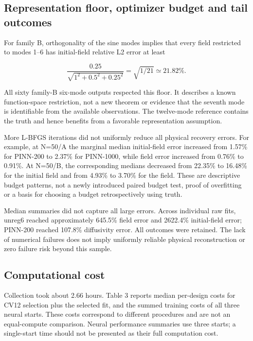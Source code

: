 \documentclass[10pt,a4paper]{article}
\begin{document}
\subsection{Representation floor, optimizer budget and tail outcomes}

For family B, orthogonality of the sine modes implies that every field restricted
to modes 1–6 has initial-field relative L2 error at least

\begin{equation}
\frac{0.25}{\sqrt{1^2+0.5^2+0.25^2}}
=\sqrt{1/21}\simeq21.82\%.
\end{equation}

All sixty family-B six-mode outputs respected this floor. It describes a known
function-space restriction, not a new theorem or evidence that the seventh
mode is identifiable from the available observations. The twelve-mode reference
contains the truth and hence benefits from a favorable representation assumption.

More L-BFGS iterations did not uniformly reduce all physical recovery errors.
For example, at N=50/A the marginal median initial-field error increased from
1.57\% for PINN-200 to 2.37\% for PINN-1000, while field error increased from
0.76\% to 0.91\%. At N=50/B, the corresponding medians decreased from 22.35\%
to 16.48\% for the initial field and from 4.93\% to 3.70\% for the field. These
are descriptive budget patterns, not a newly introduced paired budget test,
proof of overfitting or a basis for choosing a budget retrospectively using truth.

Median summaries did not capture all large errors. Across individual raw fits,
unreg6 reached approximately 645.5\% field error and 2622.4\% initial-field error;
PINN-200 reached 107.8\% diffusivity error. All outcomes were retained. The lack
of numerical failures does not imply uniformly reliable physical reconstruction
or zero failure risk beyond this sample.

\subsection{Computational cost}

Collection took about 2.66 hours. Table 3 reports median per-design costs for
CV12 selection plus the selected fit, and the summed training costs of all three
neural starts. These costs correspond to different procedures and are not an
equal-compute comparison. Neural performance summaries use three starts; a
single-start time should not be presented as their full computation cost.
\end{document}
